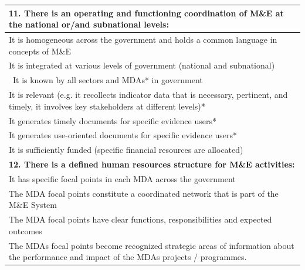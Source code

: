 \documentclass[
  10pt,
]{book}
\begin{document}
\begin{table}
\begin{tabular}[t]{l}
\hline
\multicolumn{1}{l}{\textbf{11. There is an operating and functioning coordination of M\&E at the national or/and subnational levels:}}\\
\hline
\hspace{1em}It is homogeneous across the government and holds a common language in concepts of M\&E\\
\hline
\hspace{1em}It is integrated at various levels of government (national and subnational)\\
\hline
\hspace{1em} It is known by all sectors and MDAs* in government\\
\hline
\hspace{1em}It is relevant (e.g. it recollects indicator data that is necessary, pertinent, and timely, it involves key stakeholders at different levels)*\\
\hline
\hspace{1em}It generates timely documents for specific evidence users*\\
\hline
\hspace{1em}It generates use-oriented documents for specific evidence users*\\
\hline
\hspace{1em}It is sufficiently funded (specific financial resources are allocated)\\
\hline
\multicolumn{1}{l}{\textbf{12. There is a defined human resources structure for M\&E activities:}}\\
\hline
\hspace{1em}It has specific focal points in each MDA across the government\\
\hline
\hspace{1em}The MDA focal points constitute a coordinated network that is part of the M\&E System\\
\hline
\hspace{1em}The MDA focal points have clear functions, responsibilities and expected outcomes\\
\hline
\hspace{1em}The MDAs focal points become  recognized strategic areas of information about the performance and impact of the MDAs projects / programmes.\\
\hline
\end{tabular}
\end{table}
\end{document}
